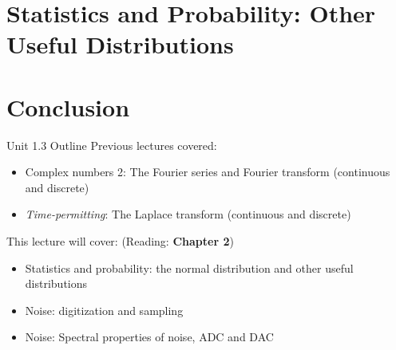 \documentclass{beamer}
\begin{document}
\section{Statistics and Probability: Other Useful Distributions}

\section{Conclusion}

\begin{frame}{Unit 1.3 Outline}
Previous lectures covered:
\begin{itemize}
\item Complex numbers 2: The Fourier series and Fourier transform (continuous and discrete)
\item \textit{Time-permitting}: The Laplace transform (continuous and discrete)
\end{itemize}
This lecture will cover: (Reading: \textbf{Chapter 2})
\begin{itemize}
\item \alert{Statistics and probability: the normal distribution and other useful distributions}
\item \alert{Noise: digitization and sampling}
\item Noise: Spectral properties of noise, ADC and DAC
\end{itemize}
\end{frame}
\end{document}
